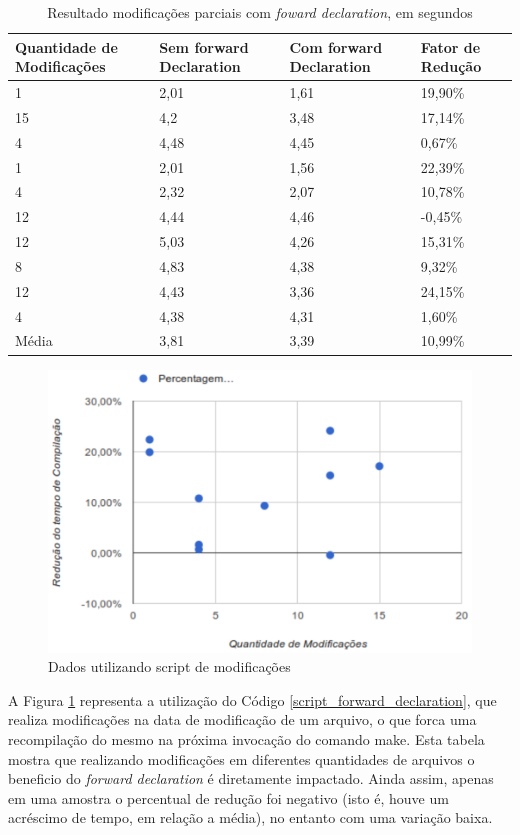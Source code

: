 \begin{table}[!ht]
\centering
\caption{Resultado modificações parciais com \textit{foward declaration}, em segundos}
\label{amostas_experimento_03}
\begin{tabular}{p{3cm}p{3cm}p{3cm}p{3cm}}
\toprule
\textbf{Quantidade de Modificações} & \textbf{Sem forward Declaration}  & \textbf{Com forward Declaration} & \textbf{Fator de Redução}\\ \midrule
1  & 2,01 & 1,61 & 19,90\% \\ \midrule
15 & 4,2  & 3,48 & 17,14\% \\ \midrule
4  & 4,48 & 4,45 & 0,67\% \\  \midrule
1  & 2,01 & 1,56 & 22,39\% \\ \midrule
4  & 2,32 & 2,07 & 10,78\% \\ \midrule
12 & 4,44 & 4,46 & -0,45\% \\ \midrule
12 & 5,03 & 4,26 & 15,31\% \\ \midrule
8  & 4,83 & 4,38 & 9,32\% \\  \midrule
12 & 4,43 & 3,36 & 24,15\% \\ \midrule
4  & 4,38 & 4,31 & 1,60\% \\  \midrule
Média  & 3,81  & 3,39  & 10,99\% \\ \bottomrule 
\end{tabular}
\end{table}


\begin{figure}[h]
    \centering
        \includegraphics[keepaspectratio=true,scale=1]{figuras/forward_declaration2.eps}
    \caption{Dados utilizando script de modificações}
    \label{grafico_forward_declaration2}
\end{figure}
A Figura \ref{grafico_forward_declaration2} representa a utilização
 do Código \ref{script_forward_declaration},
 que realiza modificações na data de modificação de um arquivo, o que forca uma
 recompilação do mesmo na próxima invocação do comando make.
 Esta tabela mostra que realizando modificações em diferentes
 quantidades de arquivos o beneficio do \textit{forward declaration} é
 diretamente impactado. Ainda assim, apenas em uma amostra o percentual
 de redução foi negativo  (isto é, houve um acréscimo de tempo,
 em relação a média), no entanto com uma variação baixa.



